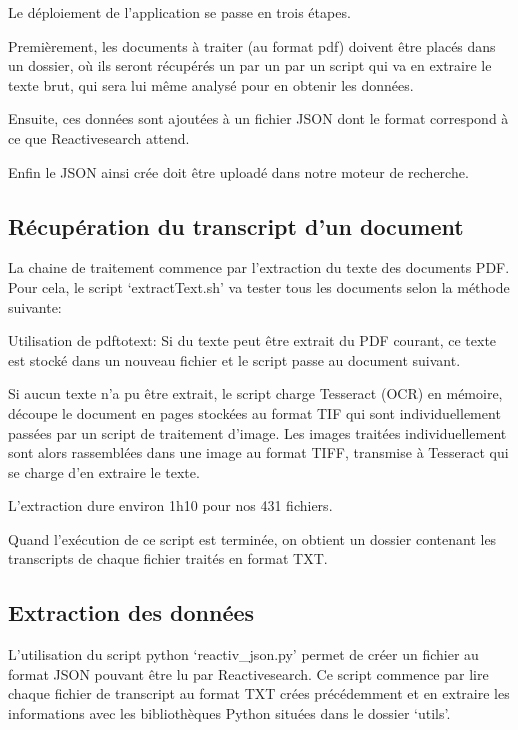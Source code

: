 

Le déploiement de l'application se passe en trois étapes.

Premièrement, les documents à traiter (au format pdf) doivent être placés dans un dossier, où ils seront récupérés un par un par un script qui va en extraire le texte brut, qui sera lui même analysé pour en obtenir les données.

Ensuite, ces données sont ajoutées à un fichier JSON dont le format correspond à ce que Reactivesearch attend.

Enfin le JSON ainsi crée doit être uploadé dans notre moteur de recherche.

\subsection{Récupération du transcript d'un document}
La chaine de traitement commence par l'extraction du texte des documents PDF.
Pour cela, le script `extractText.sh' va tester tous les documents selon la méthode suivante:

Utilisation de pdftotext: Si du texte peut être extrait du PDF courant, ce texte est stocké dans un nouveau fichier et le script passe au document suivant.

Si aucun texte n'a pu être extrait, le script charge Tesseract (\gls{OCR}) en mémoire, découpe le document en pages stockées au format TIF qui sont individuellement passées par un script de traitement d'image.
Les images traitées individuellement sont alors rassemblées dans une image au format TIFF, transmise à Tesseract qui se charge d'en extraire le texte.

L'extraction dure environ 1h10 pour nos 431 fichiers.

Quand l'exécution de ce script est terminée, on obtient un dossier contenant les transcripts de chaque fichier traités en format TXT\@.

\subsection{Extraction des données}
L'utilisation du script python `reactiv\_json.py' permet de créer un fichier au format JSON pouvant être lu par Reactivesearch.
Ce script commence par lire chaque fichier de transcript au format TXT crées précédemment et en extraire les informations avec les bibliothèques Python situées dans le dossier `utils'.

